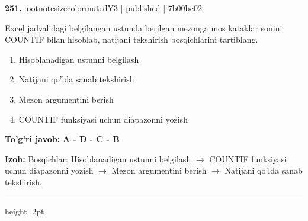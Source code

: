 \documentclass[10pt,a4paper]{article}
\begin{document}
\textbf{\color{ink}251.} {ootnotesizecolor{muted}Y3 | published | 7b00bc02}
\par
Excel jadvalidagi belgilangan ustunda berilgan mezonga mos kataklar sonini COUNTIF bilan hisoblab, natijani tekshirish bosqichlarini tartiblang.
\begin{enumerate}[label=\Alph*),leftmargin=9mm]
\item Hisoblanadigan ustunni belgilash
\item Natijani qo'lda sanab tekshirish
\item Mezon argumentini berish
\item COUNTIF funksiyasi uchun diapazonni yozish
\end{enumerate}
\begin{tcolorbox}[enhanced,breakable,colback=teal!4,colframe=teal!55!black,boxrule=0.45pt,arc=1.2mm,left=2.8mm,right=2.8mm,top=2mm,bottom=2mm]
\textbf{\color{teal}To'g'ri javob:} \textbf{A - D - C - B}
\par\smallskip
\textbf{Izoh:} Bosqichlar: Hisoblanadigan ustunni belgilash \ensuremath{\rightarrow} COUNTIF funksiyasi uchun diapazonni yozish \ensuremath{\rightarrow} Mezon argumentini berish \ensuremath{\rightarrow} Natijani qo'lda sanab tekshirish.
\end{tcolorbox}
\vspace{2mm}\hrule height .2pt\vspace{2mm}
\end{document}
